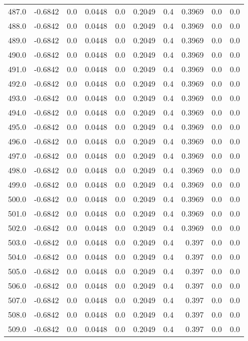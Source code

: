 \begin{longtable}{lrrrrrrrrr}
487.0 & -0.6842 & 0.0 & 0.0448 & 0.0 & 0.2049 & 0.4 & 0.3969 & 0.0 & 0.0 \\
488.0 & -0.6842 & 0.0 & 0.0448 & 0.0 & 0.2049 & 0.4 & 0.3969 & 0.0 & 0.0 \\
489.0 & -0.6842 & 0.0 & 0.0448 & 0.0 & 0.2049 & 0.4 & 0.3969 & 0.0 & 0.0 \\
490.0 & -0.6842 & 0.0 & 0.0448 & 0.0 & 0.2049 & 0.4 & 0.3969 & 0.0 & 0.0 \\
491.0 & -0.6842 & 0.0 & 0.0448 & 0.0 & 0.2049 & 0.4 & 0.3969 & 0.0 & 0.0 \\
492.0 & -0.6842 & 0.0 & 0.0448 & 0.0 & 0.2049 & 0.4 & 0.3969 & 0.0 & 0.0 \\
493.0 & -0.6842 & 0.0 & 0.0448 & 0.0 & 0.2049 & 0.4 & 0.3969 & 0.0 & 0.0 \\
494.0 & -0.6842 & 0.0 & 0.0448 & 0.0 & 0.2049 & 0.4 & 0.3969 & 0.0 & 0.0 \\
495.0 & -0.6842 & 0.0 & 0.0448 & 0.0 & 0.2049 & 0.4 & 0.3969 & 0.0 & 0.0 \\
496.0 & -0.6842 & 0.0 & 0.0448 & 0.0 & 0.2049 & 0.4 & 0.3969 & 0.0 & 0.0 \\
497.0 & -0.6842 & 0.0 & 0.0448 & 0.0 & 0.2049 & 0.4 & 0.3969 & 0.0 & 0.0 \\
498.0 & -0.6842 & 0.0 & 0.0448 & 0.0 & 0.2049 & 0.4 & 0.3969 & 0.0 & 0.0 \\
499.0 & -0.6842 & 0.0 & 0.0448 & 0.0 & 0.2049 & 0.4 & 0.3969 & 0.0 & 0.0 \\
500.0 & -0.6842 & 0.0 & 0.0448 & 0.0 & 0.2049 & 0.4 & 0.3969 & 0.0 & 0.0 \\
501.0 & -0.6842 & 0.0 & 0.0448 & 0.0 & 0.2049 & 0.4 & 0.3969 & 0.0 & 0.0 \\
502.0 & -0.6842 & 0.0 & 0.0448 & 0.0 & 0.2049 & 0.4 & 0.3969 & 0.0 & 0.0 \\
503.0 & -0.6842 & 0.0 & 0.0448 & 0.0 & 0.2049 & 0.4 & 0.397 & 0.0 & 0.0 \\
504.0 & -0.6842 & 0.0 & 0.0448 & 0.0 & 0.2049 & 0.4 & 0.397 & 0.0 & 0.0 \\
505.0 & -0.6842 & 0.0 & 0.0448 & 0.0 & 0.2049 & 0.4 & 0.397 & 0.0 & 0.0 \\
506.0 & -0.6842 & 0.0 & 0.0448 & 0.0 & 0.2049 & 0.4 & 0.397 & 0.0 & 0.0 \\
507.0 & -0.6842 & 0.0 & 0.0448 & 0.0 & 0.2049 & 0.4 & 0.397 & 0.0 & 0.0 \\
508.0 & -0.6842 & 0.0 & 0.0448 & 0.0 & 0.2049 & 0.4 & 0.397 & 0.0 & 0.0 \\
509.0 & -0.6842 & 0.0 & 0.0448 & 0.0 & 0.2049 & 0.4 & 0.397 & 0.0 & 0.0 \\

\end{longtable}
